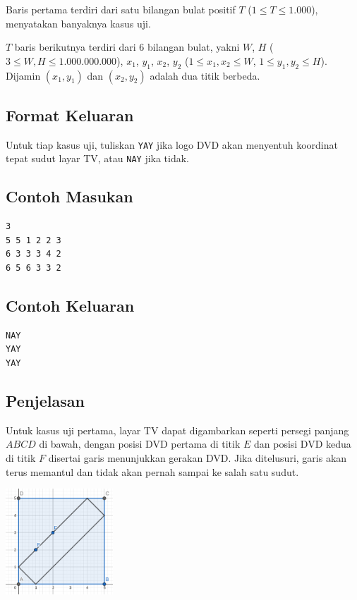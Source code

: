 \documentclass{article}
\begin{document}
Baris pertama terdiri dari satu bilangan bulat positif $T$ ($1 \leq T \leq 1.000$), menyatakan banyaknya kasus uji.

$T$ baris berikutnya terdiri dari 6 bilangan bulat, yakni $W$, $H$ ($3 \leq W, H \leq 1.000.000.000$), $x_1$, $y_1$, $x_2$, $y_2$ ($1 \leq x_1, x_2 \leq W$, $1 \leq y_1, y_2 \leq H$).
Dijamin $(x_1, y_1)$ dan $(x_2, y_2)$ adalah dua titik berbeda.

\subsection*{Format Keluaran}

Untuk tiap kasus uji, tuliskan \lstinline{YAY} jika logo DVD akan menyentuh koordinat tepat sudut layar TV, atau \lstinline{NAY} jika tidak.
\\

\begin{multicols}{2}
\subsection*{Contoh Masukan}
\begin{lstlisting}
3
5 5 1 2 2 3
6 3 3 3 4 2
6 5 6 3 3 2
\end{lstlisting}
\columnbreak
\subsection*{Contoh Keluaran}
\begin{lstlisting}
NAY
YAY
YAY
\end{lstlisting}
\vfill
\null
\end{multicols}

\subsection*{Penjelasan}
Untuk kasus uji pertama, layar TV dapat digambarkan seperti persegi panjang $ABCD$ di bawah, dengan posisi DVD pertama di titik $E$ dan posisi DVD kedua di titik $F$ disertai garis menunjukkan gerakan DVD. Jika ditelusuri, garis akan terus memantul dan tidak akan pernah sampai ke salah satu sudut.

\includegraphics[height=150px]{sample-1}
\end{document}
